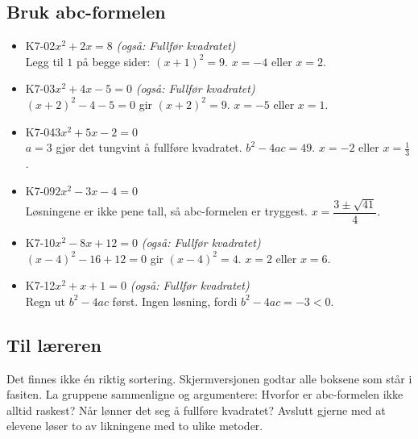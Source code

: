 \documentclass[11pt,a4paper]{article}
\begin{document}
\subsection*{Bruk abc-formelen}
\begin{itemize}[leftmargin=1.2em, itemsep=0.35em]
\item \textsf{\small K7-02}\quad $x^2 + 2x = 8$ \emph{(også: Fullfør kvadratet)}\\{\small\color{dempet}Legg til $1$ på begge sider: $(x + 1)^2 = 9$. $x = -4$ eller $x = 2$.}
\item \textsf{\small K7-03}\quad $x^2 + 4x - 5 = 0$ \emph{(også: Fullfør kvadratet)}\\{\small\color{dempet}$(x + 2)^2 - 4 - 5 = 0$ gir $(x + 2)^2 = 9$. $x = -5$ eller $x = 1$.}
\item \textsf{\small K7-04}\quad $3x^2 + 5x - 2 = 0$\\{\small\color{dempet}$a = 3$ gjør det tungvint å fullføre kvadratet. $b^2 - 4ac = 49$. $x = -2$ eller $x = \frac{1}{3}$.}
\item \textsf{\small K7-09}\quad $2x^2 - 3x - 4 = 0$\\{\small\color{dempet}Løsningene er ikke pene tall, så abc-formelen er tryggest. $x = \dfrac{3 \pm \sqrt{41}}{4}$.}
\item \textsf{\small K7-10}\quad $x^2 - 8x + 12 = 0$ \emph{(også: Fullfør kvadratet)}\\{\small\color{dempet}$(x - 4)^2 - 16 + 12 = 0$ gir $(x - 4)^2 = 4$. $x = 2$ eller $x = 6$.}
\item \textsf{\small K7-12}\quad $x^2 + x + 1 = 0$ \emph{(også: Fullfør kvadratet)}\\{\small\color{dempet}Regn ut $b^2 - 4ac$ først. Ingen løsning, fordi $b^2 - 4ac = -3 < 0$.}
\end{itemize}
\subsection*{Til læreren}
Det finnes ikke én riktig sortering. Skjermversjonen godtar alle boksene som står i fasiten. La gruppene sammenligne og argumentere: Hvorfor er abc-formelen ikke alltid raskest? Når lønner det seg å fullføre kvadratet? Avslutt gjerne med at elevene løser to av likningene med to ulike metoder.
\end{document}
